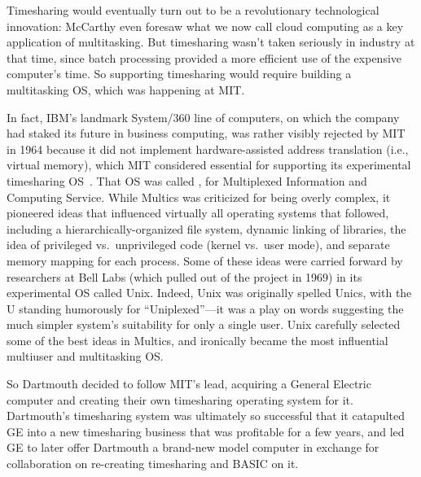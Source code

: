 Timesharing would eventually turn out to be a revolutionary
technological innovation: McCarthy even foresaw what we now call cloud
computing as a key application of multitasking.
But timesharing wasn't taken seriously in industry at that time, since batch
processing provided a more efficient use of the expensive computer's
time.  So supporting
timesharing would require building a multitasking OS, which 
was happening at MIT.

  \begin{tangent}
In fact, IBM's landmark System/360 line of computers, on which the
company had staked its future in business computing, was rather visibly
rejected by MIT in 1964 because it did not implement hardware-assisted 
address translation (i.e., virtual memory), which MIT considered
essential for supporting its experimental timesharing
OS~\cite{ibm360history}.  
That OS was called , for
Multiplexed Information and Computing Service.  While Multics was
criticized for being overly complex, it pioneered ideas that influenced
virtually all operating systems that followed, including a
hierarchically-organized file system, dynamic linking of libraries, the
idea of privileged vs.\ unprivileged code (kernel vs.\ user mode), and
separate memory mapping for each process.
Some of these ideas were carried forward by researchers at Bell Labs
(which pulled out 
of the project in 1969) in its experimental OS called Unix.
Indeed, Unix
was originally spelled Unics, with the U standing humorously for
``Uniplexed''---it was a play on words suggesting the much simpler
system's suitability for only a single user.  Unix carefully selected
some of the best ideas in Multics, and ironically
became the most influential multiuser and multitasking OS.
  \end{tangent}

So Dartmouth decided to
follow MIT's lead, acquiring a General Electric computer
and creating their own timesharing
operating system for it.
Dartmouth's timesharing system was ultimately so successful that it
catapulted GE into a new timesharing business that was profitable for a
few years, and led GE to later offer Dartmouth a brand-new model
computer in exchange for collaboration on re-creating timesharing and
BASIC on it.




